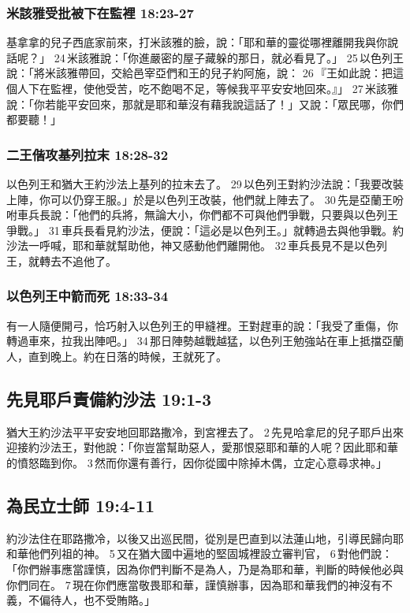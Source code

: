 \subsubsection{米該雅受批被下在監裡 18:23-27}
基拿拿的兒子西底家前來，打米該雅的臉，說：「耶和華的靈從哪裡離開我與你說話呢？」 24 米該雅說：「你進嚴密的屋子藏躲的那日，就必看見了。」 25 以色列王說：「將米該雅帶回，交給邑宰亞們和王的兒子約阿施，說： 26 『王如此說：把這個人下在監裡，使他受苦，吃不飽喝不足，等候我平平安安地回來。』」 27 米該雅說：「你若能平安回來，那就是耶和華沒有藉我說這話了！」又說：「眾民哪，你們都要聽！」

\subsubsection{二王偕攻基列拉末 18:28-32}
以色列王和猶大王約沙法上基列的拉末去了。 29 以色列王對約沙法說：「我要改裝上陣，你可以仍穿王服。」於是以色列王改裝，他們就上陣去了。 30 先是亞蘭王吩咐車兵長說：「他們的兵將，無論大小，你們都不可與他們爭戰，只要與以色列王爭戰。」 31 車兵長看見約沙法，便說：「這必是以色列王。」就轉過去與他爭戰。約沙法一呼喊，耶和華就幫助他，神又感動他們離開他。 32 車兵長見不是以色列王，就轉去不追他了。

\subsubsection{以色列王中箭而死 18:33-34}
有一人隨便開弓，恰巧射入以色列王的甲縫裡。王對趕車的說：「我受了重傷，你轉過車來，拉我出陣吧。」 34 那日陣勢越戰越猛，以色列王勉強站在車上抵擋亞蘭人，直到晚上。約在日落的時候，王就死了。

\subsection{先見耶戶責備約沙法 19:1-3}
猶大王約沙法平平安安地回耶路撒冷，到宮裡去了。 2 先見哈拿尼的兒子耶戶出來迎接約沙法王，對他說：「你豈當幫助惡人，愛那恨惡耶和華的人呢？因此耶和華的憤怒臨到你。 3 然而你還有善行，因你從國中除掉木偶，立定心意尋求神。」

\subsection{為民立士師 19:4-11}
約沙法住在耶路撒冷，以後又出巡民間，從別是巴直到以法蓮山地，引導民歸向耶和華他們列祖的神。 5 又在猶大國中遍地的堅固城裡設立審判官， 6 對他們說：「你們辦事應當謹慎，因為你們判斷不是為人，乃是為耶和華，判斷的時候他必與你們同在。 7 現在你們應當敬畏耶和華，謹慎辦事，因為耶和華我們的神沒有不義，不偏待人，也不受賄賂。」

